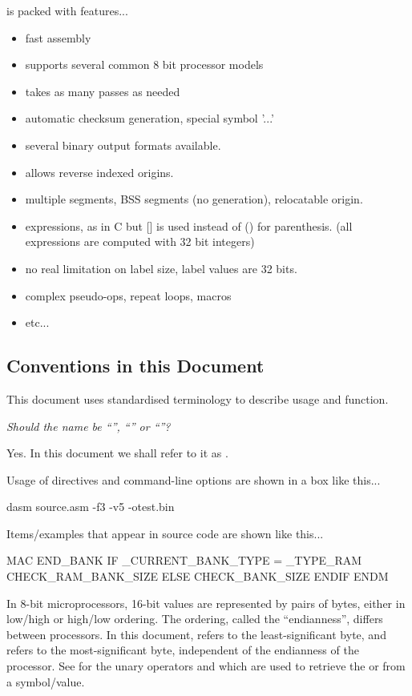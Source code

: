 \dasm is packed with features...

\begin{itemize}
	\item fast assembly
\item supports several common 8 bit processor models
\item takes as many passes as needed
\item automatic checksum generation, special symbol '...'
\item several binary output formats available.
\item allows reverse indexed origins.
\item multiple segments, BSS segments (no generation), relocatable origin.
\item expressions, as in C but [] is used instead of () for parenthesis.
(all expressions are computed with 32 bit integers)
\item no real limitation on label size, label values are 32 bits.
\item complex pseudo-ops, repeat loops, macros
\item etc...
\end{itemize}




\subsection{Conventions in this Document}

This document uses standardised terminology to describe usage and function.

\textit{Should the name be ``'', ``'' or ``''?}

Yes. In this document we shall refer to it as \dasm.

Usage of directives and command-line options are shown in a box like this...

\begin{usage}
dasm source.asm -f3 -v5 -otest.bin
\end{usage}

Items/examples that appear in source code are shown like this...

\begin{code}
  MAC END_BANK
    IF _CURRENT_BANK_TYPE = _TYPE_RAM
      CHECK_RAM_BANK_SIZE
    ELSE
      CHECK_BANK_SIZE
    ENDIF
  ENDM
\end{code}

\label{change:lsbmsb}
In 8-bit microprocessors, 16-bit values are represented by pairs of bytes, either in low/high or high/low ordering. The ordering, called the ``endianness'', differs between processors. In this document,  refers to the least-significant byte, and  refers to the most-significant byte, independent of the endianness of the processor. See  for the unary operators \mono{<} and \mono{>} which are used to retrieve the  or  from a symbol/value.

